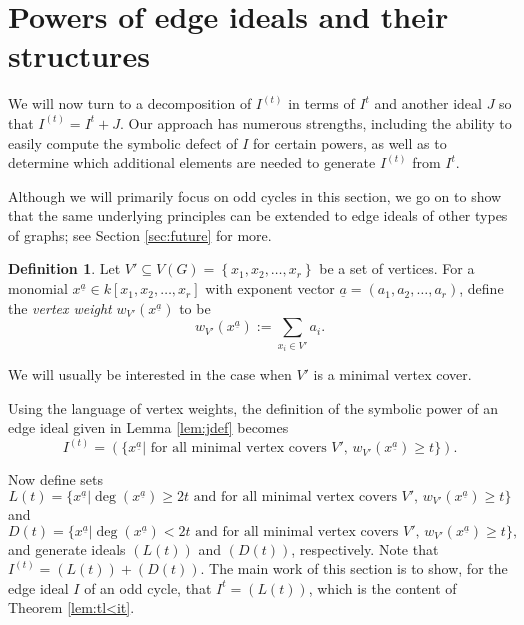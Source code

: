 \documentclass[12pt]{amsart}
\def\set#1{\left\{ {#1} \right\}}
\renewcommand{\geq}{\geqslant}
\theoremstyle{plain}
\theoremstyle{definition}
\newtheorem{definition}[theorem]{Definition}
\begin{document}


\section{Powers of edge ideals and their structures}

We will now turn to a decomposition of $I^{(t)}$ in terms of $I^t$ and another ideal $J$ so that $I^{(t)} = I^t + J$. Our approach has numerous strengths, including the ability to easily compute the symbolic defect of $I$ for certain powers, as well as to determine which additional elements are needed to generate $I^{(t)}$ from $I^t$.


Although we will primarily focus on odd cycles in this section, we go on to show that the same underlying principles can be extended to edge ideals of other types of graphs; see Section \ref{sec:future} for more.

\begin{definition}\label{defn:weights}
Let $V'\subseteq V(G) = \set{x_1,x_2,\ldots,x_{r}}$ be a set of vertices. For a monomial $x^{\underline{a}}\in k[x_1,x_2,\ldots,x_{r}]$ with exponent vector $\underline{a} = (a_1, a_2, \ldots, a_{r})$, define the \emph{vertex weight} $w_{V'}(x^{\underline{a}})$ to be 
	\[
		w_{V'}(x^{\underline{a}}) := \sum\limits_{x_i\in V'} a_i.
	\]
\end{definition}

We will usually be interested in the case when $V'$ is a minimal vertex cover.

Using the language of vertex weights, the definition of the symbolic power of an edge ideal given in Lemma \ref{lem:jdef} becomes
\[
	I^{(t)} = (\{x^{\underline{a}} | \text{ for all minimal vertex covers } V', \, w_{V'}(x^{\underline{a}}) \geq t\}).
\]

Now define sets
\[
	L(t) = \{x^{\underline{a}} | \deg(x^{\underline{a}}) \geq 2t \text{ and for all minimal vertex covers } V', \, w_{V'}(x^{\underline{a}}) \geq t\}
	\]
and
\[
	D(t) = \{x^{\underline{a}} | \deg(x^{\underline{a}}) <2t \text{ and for all minimal vertex covers } V', \, w_{V'}(x^{\underline{a}}) \geq t\},
\]
and generate ideals $(L(t))$ and $(D(t))$, respectively.
Note that $I^{(t)} = (L(t)) + (D(t))$.
The main work of this section is to show, for the edge ideal $I$ of an odd cycle, that $I^t = (L(t))$, which is the content of Theorem \ref{lem:tl<it}.
\end{document}
